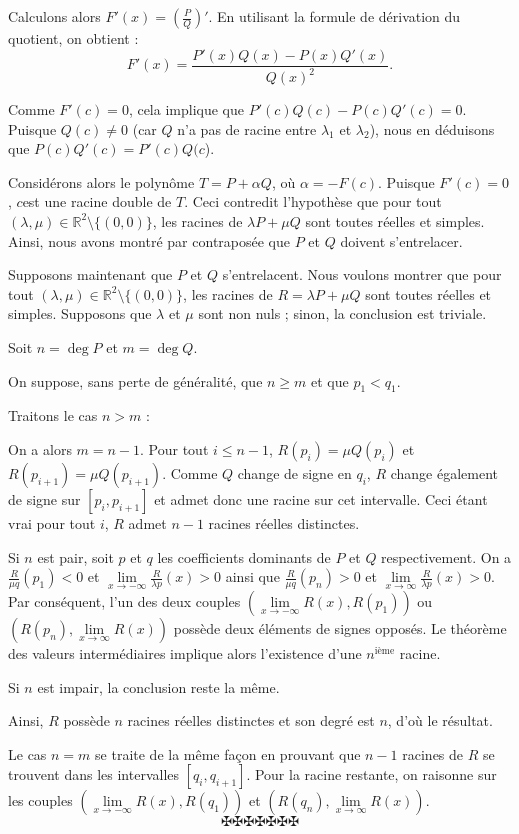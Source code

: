 Calculons alors $F' (x) = \left( \frac{P}{Q} \right)'$. En utilisant la
formule de d{\'e}rivation du quotient, on obtient :
\[ F' (x) = \frac{P' (x) Q (x) - P (x) Q' (x)}{Q (x)^2} . \]


Comme $F' (c) = 0$, cela implique que $P' (c) Q (c) - P (c) Q' (c) = 0$.
Puisque $Q (c) \neq 0$ (car $Q$ n'a pas de racine entre $\lambda_1$ et
$\lambda_2$), nous en d{\'e}duisons que $P (c) Q' (c) = P' (c) Q (c$).

Consid{\'e}rons alors le polyn{\^o}me $T = P + \alpha Q$, o{\`u} $\alpha = - F
(c)$. Puisque $F' (c) = 0$, $c$est une racine double de $T$. Ceci contredit
l'hypoth{\`e}se que pour tout $(\lambda, \mu) \in \mathbb{R}^2 \setminus \{(0,
0)\}$, les racines de $\lambda P + \mu Q$ sont toutes r{\'e}elles et simples.
Ainsi, nous avons montr{\'e} par contrapos{\'e}e que $P$ et $Q$ doivent
s'entrelacer.


Supposons maintenant que $P$ et $Q$ s'entrelacent. Nous voulons montrer que
pour tout $(\lambda, \mu) \in \mathbb{R}^2 \setminus \{(0, 0)\}$, les racines
de $R = \lambda P + \mu Q$ sont toutes r{\'e}elles et simples. Supposons que
$\lambda$ et $\mu$ sont non nuls ; sinon, la conclusion est triviale.

Soit $n = \deg P$ et $m = \deg Q$.

On suppose, sans perte de g{\'e}n{\'e}ralit{\'e}, que $n \geq m$ et que $p_1 <
q_1$.

Traitons le cas $n > m$ : 

On a alors $m = n - 1$. Pour tout $i \leq n - 1$, $R (p_i) = \mu Q (p_i)$ et
$R (p_{i + 1}) = \mu Q (p_{i + 1})$. Comme $Q$ change de signe en $q_i$, $R$
change {\'e}galement de signe sur $[p_i, p_{i + 1}]$ et admet donc une racine
sur cet intervalle. Ceci {\'e}tant vrai pour tout $i$, $R$ admet $n - 1$
racines r{\'e}elles distinctes.

Si $n$ est pair, soit $p$ et $q$ les coefficients dominants de $P$ et $Q$
respectivement. On a $\frac{R}{\mu q} (p_1) < 0$ et $\underset{x \to -
\infty}{\lim }  \frac{R}{\lambda p} (x) > 0$ ainsi que $\frac{R}{\mu q} (p_n)
> 0$ et $\underset{x \to \infty}{\lim }  \frac{R}{\lambda p} (x) > 0$. Par
cons{\'e}quent, l'un des deux couples $(\underset{x \to - \infty}{\lim } R
(x), R (p_1))$ ou $(R (p_n), \underset{x \to \infty}{\lim } R (x))$
poss{\`e}de deux {\'e}l{\'e}ments de signes oppos{\'e}s. Le th{\'e}or{\`e}me
des valeurs interm{\'e}diaires implique alors l'existence d'une
$n^{\text{i{\`e}me}}$ racine.

Si $n$ est impair, la conclusion reste la m{\^e}me.

Ainsi, $R$ poss{\`e}de $n$ racines r{\'e}elles distinctes et son degr{\'e} est
$n$, d'o{\`u} le r{\'e}sultat.

Le cas $n = m$ se traite de la m{\^e}me fa{\c c}on en prouvant que $n - 1$
racines de $R$ se trouvent dans les intervalles $[q_i, q_{i + 1}]$. Pour la
racine restante, on raisonne sur les couples $(\underset{x \to - \infty}{\lim}
R (x), R (q_1))$ et $(R (q_n), \underset{x \to \infty}{\lim}  R (x))$.
\[ \maltese \maltese \maltese \maltese \maltese \maltese \maltese \]
